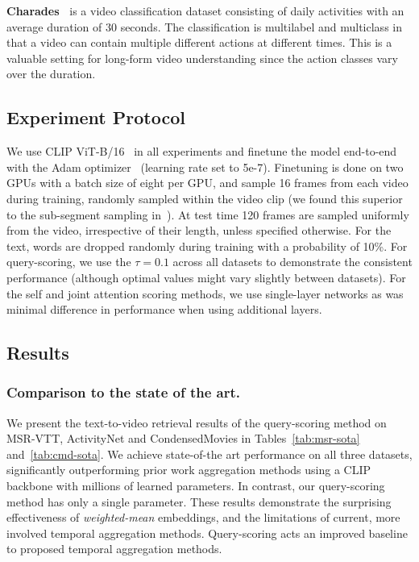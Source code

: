 \noindent\textbf{Charades~\cite{sigurdsson2016hollywood}} is a video classification dataset consisting of daily activities with an average duration of 30 seconds. The classification is multilabel and multiclass in that a video can contain multiple different actions at different times. This is a valuable setting for long-form video understanding since the action classes vary over the duration.

\subsection{Experiment Protocol}
\label{subsec:protocol}
We use CLIP ViT-B/16~\cite{radford2021learning} in all experiments and finetune the model end-to-end with the Adam optimizer~\cite{DBLP:journals/corr/KingmaB14} (learning rate set to 5e-7). Finetuning is done on two GPUs with a batch size of eight per GPU, and sample 16 frames from each video during training, randomly sampled within the video clip (we found this superior to the sub-segment sampling in~\cite{Bain21}). At test time 120 frames are sampled uniformly from the video, irrespective of their length, unless specified otherwise. For the text, words are dropped randomly during training with a probability of 10\%. For query-scoring, we use the $\tau=0.1$ across all datasets to demonstrate the consistent performance (although optimal values might vary slightly between datasets). For the self and joint attention scoring methods, we use single-layer networks as was minimal difference in performance when using additional layers.
\subsection{Results}
\label{subsec:results}
\subsubsection{Comparison to the state of the art.}
We present the text-to-video retrieval results of the query-scoring method on MSR-VTT, ActivityNet and CondensedMovies in Tables~\ref{tab:msr-sota} and~\ref{tab:cmd-sota}. We achieve state-of-the art performance on all three datasets, significantly outperforming prior work aggregation methods using a CLIP backbone with millions of learned parameters. In contrast, our query-scoring method has only a single parameter. These results demonstrate the surprising effectiveness of \textit{weighted-mean} embeddings, and the limitations of current, more involved temporal aggregation methods. Query-scoring acts an improved baseline to proposed temporal aggregation methods.


